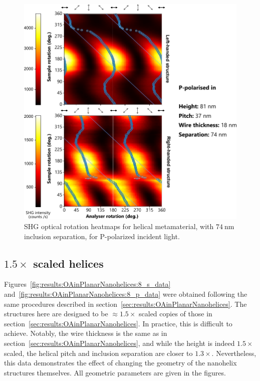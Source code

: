 \begin{figure}[htb!]	
    \centering	
    \includegraphics[scale=1]{./figures/results/OAinPlanarNanohelices/b_p_data.pdf}

    \caption{\label{fig:results:OAinPlanarNanohelices:b_p_data}
    SHG optical rotation heatmaps for helical metamaterial, with $\SI{74}{\nano\m}$ inclusion separation, for P-polarized incident light.}	
\end{figure}

\subsection{$1.5 \times$ scaled helices}
Figures~\ref{fig:results:OAinPlanarNanohelices:8_s_data} and~\ref{fig:results:OAinPlanarNanohelices:8_p_data} were obtained following the same procedures described in section~\ref{sec:results:OAinPlanarNanohelices}. The structures here are designed to be $\approx 1.5 \times$ scaled copies of those in section~\ref{sec:results:OAinPlanarNanohelices}. In practice, this is difficult to achieve. Notably, the wire thickness is the same as in section~\ref{sec:results:OAinPlanarNanohelices}, and while the height is indeed $1.5 \times$ scaled, the helical pitch and inclusion separation are closer to $1.3 \times$.  Nevertheless, this data demonstrates the effect of changing the geometry of the nanohelix structures themselves. All geometric parameters are given in the  figures.

